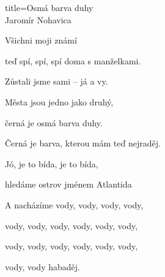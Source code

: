 \begin{song}{title=\centering Osmá barva duhy \\\normalsize Jaromír Nohavica  \vspace*{-0.3cm}}
{\begin{minipage}[t]{0.48\textwidth}
	Všichni moji známí
	
	teď spí, spí, spí doma s manželkami.

	Zůstali jsme sami -- já a vy.
	
	Města jsou jedno jako druhý,
	
	černá je osmá barva duhy.
	
	Černá je barva, kterou mám teď nejraděj.
	
	Jó, je to bída, je to bída,
	
	hledáme ostrov jménem Atlantida
	
	A nacházíme vody, vody, vody, vody,
	
	vody, vody, vody, vody, vody, vody,
	
	vody, vody, vody, vody, vody, vody,

	vody, vody habaděj. 

\end{minipage}
}
\setcounter{Slokočet}{0}
\end{song}
